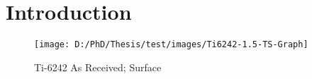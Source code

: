 \chapter{Introduction}

\begin{figure}[H]
    \centering
        \texttt{[image: D:/PhD/Thesis/test/images/Ti6242-1.5-TS-Graph]}
        \caption{Ti-6242 As Received; Surface}
    \label{fig:EDM-Cut}
\end{figure}

